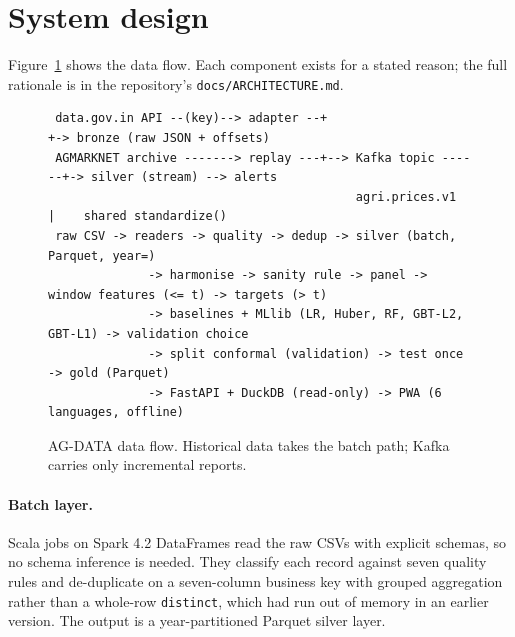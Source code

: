 \section{System design}\label{sec:system}

Figure~\ref{fig:arch} shows the data flow. Each component exists for a stated reason; the full rationale is in the
repository's \texttt{docs/ARCHITECTURE.md}.

\begin{figure}[t]
\centering
\small
\begin{verbatim}
 data.gov.in API --(key)--> adapter --+                      +-> bronze (raw JSON + offsets)
 AGMARKNET archive -------> replay ---+--> Kafka topic ------+-> silver (stream) --> alerts
                                           agri.prices.v1     |    shared standardize()
 raw CSV -> readers -> quality -> dedup -> silver (batch, Parquet, year=)
              -> harmonise -> sanity rule -> panel -> window features (<= t) -> targets (> t)
              -> baselines + MLlib (LR, Huber, RF, GBT-L2, GBT-L1) -> validation choice
              -> split conformal (validation) -> test once -> gold (Parquet)
              -> FastAPI + DuckDB (read-only) -> PWA (6 languages, offline)
\end{verbatim}
\caption{AG-DATA data flow. Historical data takes the batch path; Kafka carries only incremental reports.}
\label{fig:arch}
\end{figure}

\paragraph{Batch layer.}
Scala jobs on Spark 4.2 DataFrames read the raw CSVs with explicit schemas, so no schema inference is needed.
They classify each record against seven quality rules and de-duplicate on a seven-column business key with grouped aggregation rather than a whole-row \texttt{distinct}, which had run out of memory in an earlier version.
The output is a year-partitioned Parquet silver layer.

